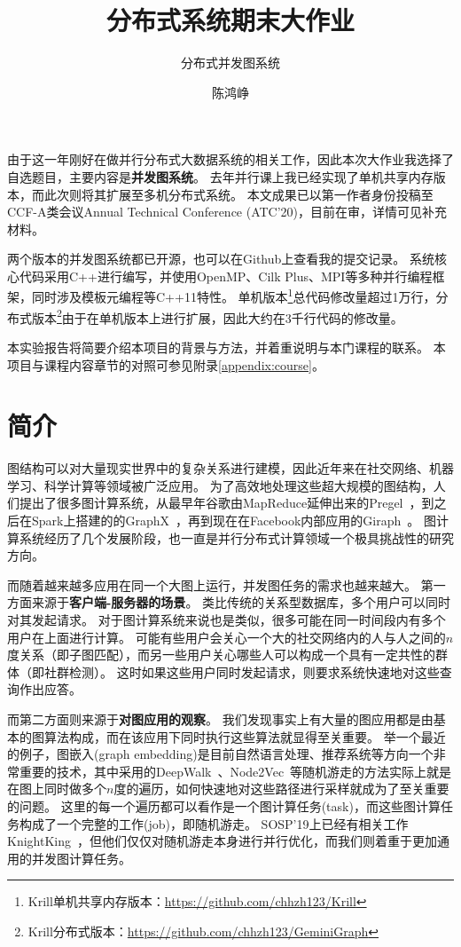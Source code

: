 \documentclass[logo,reportComp]{thesis}
\title{分布式系统期末大作业}
\subtitle{分布式并发图系统}
\author{陈鸿峥}
\begin{document}
\maketitle

由于这一年刚好在做并行分布式大数据系统的相关工作，因此本次大作业我选择了自选题目，主要内容是\textbf{并发图系统}。
去年并行课上我已经实现了单机共享内存版本，而此次则将其扩展至多机分布式系统。
本文成果已以第一作者身份投稿至CCF-A类会议Annual Technical Conference (ATC'20)，目前在审，详情可见补充材料。

两个版本的并发图系统都已开源，也可以在Github上查看我的提交记录。
系统核心代码采用C++进行编写，并使用OpenMP、Cilk Plus、MPI等多种并行编程框架，同时涉及模板元编程等C++11特性。
单机版本\footnote{Krill单机共享内存版本：\url{https://github.com/chhzh123/Krill}}总代码修改量超过1万行，分布式版本\footnote{Krill分布式版本：\url{https://github.com/chhzh123/GeminiGraph}}由于在单机版本上进行扩展，因此大约在3千行代码的修改量。

本实验报告将简要介绍本项目的背景与方法，并着重说明与本门课程的联系。
本项目与课程内容章节的对照可参见附录\ref{appendix:course}。

\section{简介}
图结构可以对大量现实世界中的复杂关系进行建模，因此近年来在社交网络、机器学习、科学计算等领域被广泛应用。
为了高效地处理这些超大规模的图结构，人们提出了很多图计算系统，从最早年谷歌由MapReduce延伸出来的Pregel~\cite{malewicz:pregel_icmd_2010}，到之后在Spark上搭建的的GraphX~\cite{gonzalez:graphx_osdi_2014}，再到现在在Facebook内部应用的Giraph~\cite{ching:giraph_vldb_2015}。
图计算系统经历了几个发展阶段，也一直是并行分布式计算领域一个极具挑战性的研究方向。

而随着越来越多应用在同一个大图上运行，并发图任务的需求也越来越大。
第一方面来源于\textbf{客户端-服务器的场景}。
类比传统的关系型数据库，多个用户可以同时对其发起请求。
对于图计算系统来说也是类似，很多可能在同一时间段内有多个用户在上面进行计算。
可能有些用户会关心一个大的社交网络内的人与人之间的$n$度关系（即子图匹配），而另一些用户关心哪些人可以构成一个具有一定共性的群体（即社群检测）。
这时如果这些用户同时发起请求，则要求系统快速地对这些查询作出应答。

而第二方面则来源于\textbf{对图应用的观察}。
我们发现事实上有大量的图应用都是由基本的图算法构成，而在该应用下同时执行这些算法就显得至关重要。
举一个最近的例子，图嵌入(graph embedding)是目前自然语言处理、推荐系统等方向一个非常重要的技术，其中采用的DeepWalk~\cite{perozzi:deepwalk_kdd_2014}、Node2Vec~\cite{grover_node2vec_2016}等随机游走的方法实际上就是在图上同时做多个$n$度的遍历，如何快速地对这些路径进行采样就成为了至关重要的问题。
这里的每一个遍历都可以看作是一个图计算任务(task)，而这些图计算任务构成了一个完整的工作(job)，即随机游走。
SOSP'19上已经有相关工作KnightKing~\cite{yang_knightking:_2019}，但他们仅仅对随机游走本身进行并行优化，而我们则着重于更加通用的并发图计算任务。
\end{document}
